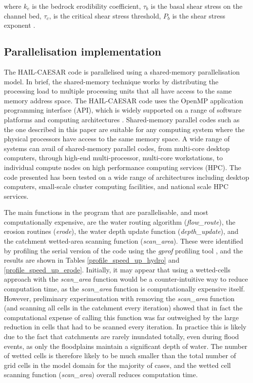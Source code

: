 \noindent
where \(k_e\) is the bedrock erodibility coefficient, \(\tau_b\) is the basal shear stress on the channel bed, \(\tau_c\), is the critical shear stress threshold, \(P_b\) is the shear stress exponent \citep{howard1983channel,whipple1999dynamics}.

\subsection{Parallelisation implementation}
The HAIL-CAESAR code is parallelised using a shared-memory parallelisation model. In brief, the shared-memory technique works by distributing the processing load to multiple processing units that all have access to the same memory address space. The HAIL-CAESAR code uses the OpenMP application programming interface (API), which is widely supported on a range of software platforms and computing architectures \citep{dagum1998openmp}. Shared-memory parallel codes such as the one described in this paper are suitable for any computing system where the physical processors have access to the same memory space. A wide range of systems can avail of shared-memory parallel codes, from multi-core desktop computers, through high-end multi-processor, multi-core workstations, to individual compute nodes on high performance computing services (HPC). The code presented has been tested on a wide range of architectures including desktop computers,  small-scale cluster computing facilities, and national scale HPC services.

The main functions in the program that are parallelisable, and most computationally expensive, are the water routing algorithm (\textit{flow\_route}), the erosion routines (\textit{erode}), the water depth update function (\textit{depth\_update}), and the catchment wetted-area scanning function (\textit{scan\_area}). These were identified by profiling the serial version of the code using the \textit{gprof} profiling tool \citep{graham1982gprof}, and the results are shown in Tables \ref{profile_speed_up_hydro} and \ref{profile_speed_up_erode}. Initially, it may appear that using a wetted-cells approach with the \textit{scan\_area} function would be a counter-intuitive way to reduce computation time, as the \textit{scan\_area} function is computationally expensive itself. However, preliminary experimentation with removing the \textit{scan\_area} function (and scanning all cells in the catchment every iteration) showed that in fact the computational expense of calling this function was far outweighed by the large reduction in cells that had to be scanned every iteration. In practice this is likely due to the fact that catchments are rarely inundated totally, even during flood events, as only the floodplains maintain a significant depth of water. The number of wetted cells is therefore likely to be much smaller than the total number of grid cells in the model domain for the majority of cases, and the wetted cell scanning function (\textit{scan\_area}) overall reduces computation time.

